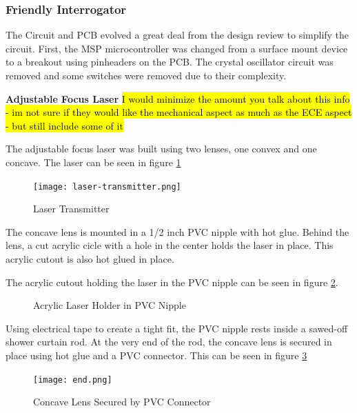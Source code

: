 \documentclass[letterpaper,10pt]{article}
\begin{document}
\begin{spacing}{1.15}
\subsubsection{Friendly Interrogator}
The Circuit and PCB evolved a great deal from the design review to simplify the circuit. First, the MSP microcontroller was changed from a surface mount device to a breakout using pinheaders on the PCB. The crystal oscillator circuit was removed and some switches were removed due to their complexity.

\hspace{5mm}\textbf{Adjustable Focus Laser}
\label{section:interrogator-adjustable-focus-laser}
\hl{I would minimize the amount you talk about this info - im not sure if they would like the mechanical aspect as much as the ECE aspect - but still include some of it}

The adjustable focus laser was built using two lenses, one convex and one concave. The laser can be seen in figure \ref{fig:laser-transmitter}

\begin{figure} [H]
	\centering
	\texttt{[image: laser-transmitter.png]}
	\label{fig:laser-transmitter}
	\caption{Laser Transmitter}
\end{figure}

The concave lens is mounted in a 1/2 inch PVC nipple with hot glue. Behind the lens, a cut acrylic cicle with a hole in the center holds the laser in place. This acrylic cutout is also hot glued in place.

The acrylic cutout holding the laser in the PVC nipple can be seen in figure \ref{fig:acrylic}.

	\begin{figure}%
		\centering
		\qquad
		\caption{Acrylic Laser Holder in PVC Nipple}%
		\label{fig:acrylic}%
	\end{figure}
	
Using electrical tape to create a tight fit, the PVC nipple rests inside a sawed-off shower curtain rod. At the very end of the rod, the concave lens is secured in place using hot glue and a PVC connector. This can be seen in figure \ref{fig:end}

\begin{figure} [H]
	\centering
	\texttt{[image: end.png]}
	\label{fig:end}
	\caption{Concave Lens Secured by PVC Connector}
\end{figure}


\end{spacing}
\end{document}

